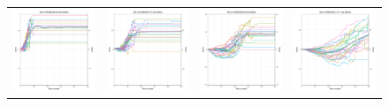 \begin{figure}
\centering
\begin{tabular}{cccc}
\hspace{-0.5cm}\includegraphics[width = 1.55in]{images/Visualizations/GAvsRANDOM/500ms5x5.png} &
\hspace{-0.5cm}\includegraphics[width = 1.55in]{images/Visualizations/GAvsRANDOM/500ms7x7.png} &
\hspace{-0.5cm}\includegraphics[width = 1.55in]{images/Visualizations/GAvsRANDOM/500ms9x9.png} &
\hspace{-0.5cm}\includegraphics[width = 1.55in]{images/Visualizations/GAvsRANDOM/500ms11x11.png} \\


\end{tabular}
\end{figure}
